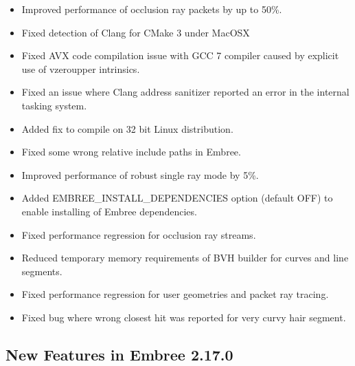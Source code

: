 \begin{itemize}
\tightlist
\item
  Improved performance of occlusion ray packets by up to 50\%.
\item
  Fixed detection of Clang for CMake 3 under MacOSX
\item
  Fixed AVX code compilation issue with GCC 7 compiler caused by
  explicit use of vzeroupper intrinsics.
\item
  Fixed an issue where Clang address sanitizer reported an error in the
  internal tasking system.
\item
  Added fix to compile on 32 bit Linux distribution.
\item
  Fixed some wrong relative include paths in Embree.
\item
  Improved performance of robust single ray mode by 5\%.
\item
  Added EMBREE\_INSTALL\_DEPENDENCIES option (default OFF) to enable
  installing of Embree dependencies.
\item
  Fixed performance regression for occlusion ray streams.
\item
  Reduced temporary memory requirements of BVH builder for curves and
  line segments.
\item
  Fixed performance regression for user geometries and packet ray
  tracing.
\item
  Fixed bug where wrong closest hit was reported for very curvy hair
  segment.
\end{itemize}

\subsection{New Features in Embree
2.17.0}\label{new-features-in-embree-2.17.0}


